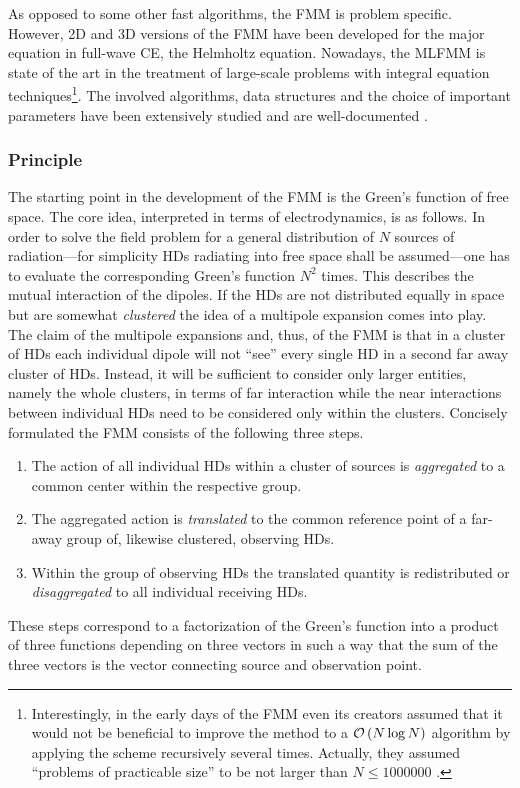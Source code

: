 As opposed to some other fast algorithms, the \ac{FMM} is problem specific. 
However, 2D \cite{Rokhlin1990} and 3D \cite{Rokhlin1993, Coifman1993}
versions of the \ac{FMM} have been developed for the major equation in
full-wave \ac{CE}, the Helmholtz equation.
Nowadays, the \ac{MLFMM} is state of the art in the treatment of
large-scale problems with integral equation techniques\footnote{
	Interestingly, in the early days of the \ac{FMM} even its creators assumed
	that it would not be beneficial to improve the method to a
	$\mathcal{O} \left( N \log N \right)$ algorithm by applying the scheme recursively several
	times. Actually, they assumed \enquote{problems of practicable size} to be
	not larger than $N \le \num{1000000}$ \cite{Rokhlin1993}.
}.
The involved algorithms, data structures and the choice of important
parameters have been extensively studied and  are well-documented
\cite{Chew2001}.






\subsubsection{Principle}

The starting point in the development of the \ac{FMM} is the Green's function
of free space.
The core idea, interpreted in terms of electrodynamics, is as follows.
In order to solve the field problem for a general distribution of $N$ sources
of radiation---for simplicity \acp{HD} radiating into free space shall be
assumed---one has to evaluate the corresponding Green's function $N^2$ times.
This describes the mutual interaction of the dipoles.
If the \acp{HD} are not distributed equally in space but are somewhat 
\emph{clustered} the idea of a multipole expansion 
\cite{Jackson2013,vanBladel2007} comes into play.
The claim of the multipole expansions and, thus, of the \ac{FMM} is that in a
cluster of \acp{HD} each individual dipole will not \enquote{see} every
single \ac{HD} in a second far away cluster of \acp{HD}.
Instead, it will be sufficient to consider only larger entities, namely the
whole clusters, in terms of far interaction while the near interactions
between individual \acp{HD} need to be considered only within the clusters.
Concisely formulated the \ac{FMM} consists of the following three steps. 
\begin{enumerate}
	\item The action of all individual \acp{HD} within a cluster of sources
	is \emph{aggregated} to a common center within the respective group. 
	\item The aggregated action is \emph{translated} to the common reference
	point of a far-away group of, likewise clustered, observing \acp{HD}.
	\item Within the group of observing \acp{HD} the translated quantity is
	redistributed or \emph{disaggregated} to all individual receiving \acp{HD}.
\end{enumerate}
These steps correspond to a factorization of the Green's function
into a product of three functions depending on three vectors in such a way
that the sum of the three vectors is the vector connecting source and 
observation point.

